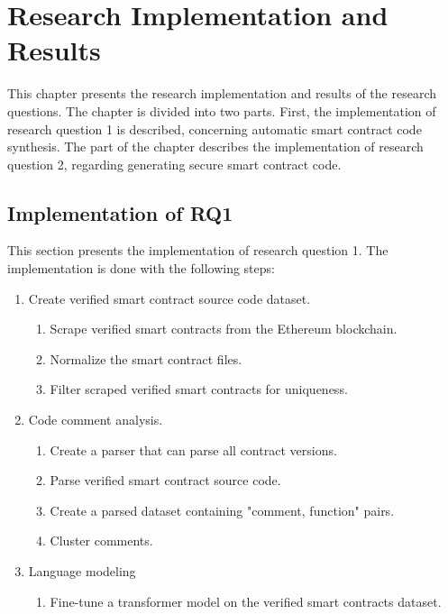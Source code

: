 
\chapter{Research Implementation and Results}
\label{chap:implementation-and-results}
This chapter presents the research implementation and results of the research questions. The chapter is divided into two parts. First, the implementation of research question 1 is described, concerning automatic smart contract code synthesis. The part of the chapter describes the implementation of research question 2, regarding generating secure smart contract code.

\section{Implementation of RQ1}
This section presents the implementation of research question 1. The implementation is done with the following steps:
\begin{enumerate}
    \item Create verified smart contract source code dataset.
    \begin{enumerate}
        \item Scrape verified smart contracts from the Ethereum blockchain.
        \item Normalize the smart contract files.
        \item Filter scraped verified smart contracts for uniqueness.
    \end{enumerate}
    \item Code comment analysis.
    \begin{enumerate}
        \item Create a parser that can parse all contract versions.
        \item Parse verified smart contract source code.
        \item Create a parsed dataset containing "comment, function" pairs.
        \item Cluster comments.
    \end{enumerate}
    \item Language modeling
    \begin{enumerate}
        \item Fine-tune a transformer model on the verified smart contracts dataset.
    \end{enumerate}
\end{enumerate}

